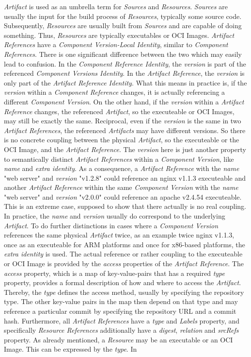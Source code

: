 \noindent \emph{Artifact} is used as an umbrella term for \emph{Sources} and \emph{Resources}. \emph{Sources} are usually the input for the build process of \emph{Resources}, typically some source code. Subsequently, \emph{Resources} are usually built from \emph{Sources} and are capable of doing something. Thus, \emph{Resources} are typically executables or OCI Images. \emph{Artifact References} have a \emph{Component Version-Local Identity}, similar to \emph{Component References}. There is one significant difference between the two which may easily lead to confusion. In the \emph{Component Reference Identity}, the \emph{version} is part of the referenced \emph{Component Versions Identity}. In the \emph{Artifact Reference}, the \emph{version} is only part of the \emph{Artifact Reference Identity}. What this means in practice is, if the \emph{version} within a \emph{Component Reference} changes, it is actually referencing a different \emph{Component Version}. On the other hand, if the \emph{version} within a \emph{Artifact Reference} changes, the referenced \emph{Artifact}, so the executeable or OCI Images, may still be exactly the same. Reciprocal, even if the \emph{version} is the same in two \emph{Artifact References}, the referenced \emph{Artifacts} may have different versions. So there is no concrete coupling between the physical \emph{Artifact}, so the executeable or the OCI Image, and the \emph{Artifact Reference}. The \emph{version} here is just another property to semantically distinct \emph{Artifact References} within a \emph{Component Version}, like \emph{name} and \emph{extra identity}. As a consequence, a \emph{Artifact Reference} with the \emph{name} "web server" and \emph{version} "v1.2.8" could reference an nginx v1.1.3 executeable and another \emph{Artifact Reference} within the same \emph{Component Version} with the \emph{name} "web server" and \emph{version} "v2.0.0" could reference an apache v2.4.54 executeable. This is an extreme case, supposed to show that there actually is no real coupling. In practice, the \emph{name} and \emph{version} usually do correspond to the underlying \emph{Artifact}. To do further distinctions in cases where a \emph{Component Version} references the same physical \emph{Artifact} twice, as an example twice nginx v1.1.3, once as an executeable for ARM platforms and once for x86-based platforms, the \emph{extra identity} is used. The actual reference or rather coupling to the executeable or OCI Image is provided by the \emph{access} properties of the \emph{Artifact Reference}. The \emph{access} property, which is a map of key-value-pairs that has a required \emph{type} property, provides a formal description of how and where to access the \emph{Artifact}. Thereby, the \emph{type} defines the access method, usually by specifying the repository type. The other key-value pairs in the map then depend on that type and may reference a particular commit by specifying the repository URL and a commit hash. Furthermore, all \emph{Artifact References} have a \emph{type} and \emph{Labels} property, and specifically \emph{Resource References} additionally have a \emph{digest}, \emph{relation} and \emph{srcRefs} property. As already mentioned, a \emph{Resource} may be an executable or an OCI Image. This can be expressed by the \emph{type}. In 